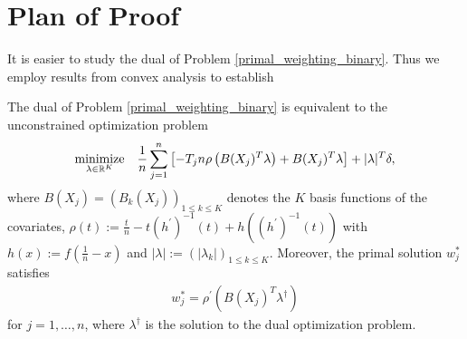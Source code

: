 \section*{Plan of Proof}

It is easier to study the dual of 
Problem \eqref{primal_weighting_binary}.
Thus we employ results from convex analysis
\cite{Mordukhovich2022}
to establish
\begin{proposition}
  \label{ch_1_dual}
  The dual of Problem \eqref{primal_weighting_binary}
  is equivalent to the unconstrained optimization problem
  \begin{gather}
    \label{dual_weighting_binary}
    \underset{\lambda \in \mathbb{R}^K}{\text{minimize}}
    \quad
    \frac{1}{n}
    \sum_{j = 1}^{n} 
      \left[ 
        -T_j n 
        \rho 
        \left( 
          B(X_j)^T \lambda
        \right)
        +
        B(X_j)^T \lambda
      \right]
    +
    |\lambda|^T \delta,
  \end{gather}
  where 
  $
    B(X_j)=(B_k(X_j))_{1 \le k \le K}
  $
  denotes the $K$ basis functions of the covariates,
  $
    \rho(t) 
    :=
    \frac{t}{n}
    -
    t
    (h^{'})^{-1}(t)
    +
    h((h^{'})^{-1}(t))
  $
  with
  $
    h(x)
    :=
    f%
    \left( 
      \frac{1}{n}
      -
      x
    \right)
  $
  and
  $
    | \lambda | 
    :=
    \left(
    | \lambda_k | 
    \right)_{1 \le k \le K}
  $.
  Moreover,
  the primal solution
  $
    w^*_j
  $
  satisfies
  \begin{gather}
    \label{ch_1_w*}
    w^*_j
    =
    \rho^{'}
    \left(
      B(X_j)^T
      \lambda^\dagger
    \right)
  \end{gather}
  for 
  $
    j
    =
    1, \ldots , n
  $,
  where 
  $
    \lambda^\dagger
  $
  is the solution to the dual optimization problem.
\end{proposition}

